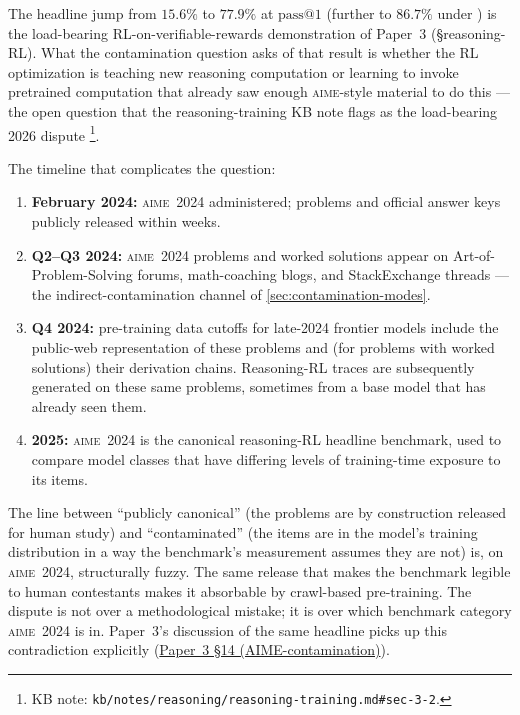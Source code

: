 The headline jump from $15.6\%$ to $77.9\%$ at $\mathrm{pass}@1$
(further to $86.7\%$ under ) is the load-bearing
RL-on-verifiable-rewards demonstration of Paper~3 (§reasoning-RL).
What the contamination question asks of that result is whether the RL
optimization is teaching new reasoning computation or learning to
invoke pretrained computation that already saw enough \textsc{aime}-style
material to do this --- the open question that the
reasoning-training KB note flags as the load-bearing 2026 dispute%
\footnote{KB note: \texttt{kb/notes/reasoning/reasoning-training.md\#sec-3-2}.}.

The timeline that complicates the question:

\begin{enumerate}
\item \textbf{February 2024:} \textsc{aime~2024} administered;
problems and official answer keys publicly released within weeks.
\item \textbf{Q2--Q3 2024:} \textsc{aime~2024} problems and worked
solutions appear on Art-of-Problem-Solving forums, math-coaching
blogs, and StackExchange threads --- the indirect-contamination
channel of \cref{sec:contamination-modes}.
\item \textbf{Q4 2024:} pre-training data cutoffs for late-2024
frontier models include the public-web representation of these
problems and (for problems with worked solutions) their
derivation chains. Reasoning-RL traces are subsequently generated
on these same problems, sometimes from a base model that has
already seen them.
\item \textbf{2025:} \textsc{aime~2024} is the canonical
reasoning-RL headline benchmark, used to compare model classes
that have differing levels of training-time exposure to its
items.
\end{enumerate}

The line between ``publicly canonical'' (the problems are by
construction released for human study) and ``contaminated'' (the
items are in the model's training distribution in a way the
benchmark's measurement assumes they are not) is, on
\textsc{aime~2024}, structurally fuzzy. The same release that makes
the benchmark legible to human contestants makes it absorbable by
crawl-based pre-training. The dispute is not over a methodological
mistake; it is over which benchmark category \textsc{aime~2024} is
in. Paper~3's discussion of the same headline picks up this
contradiction explicitly (\hyperref[P3-sec:contradictions]{Paper~3 §14 (AIME-contamination)}).

